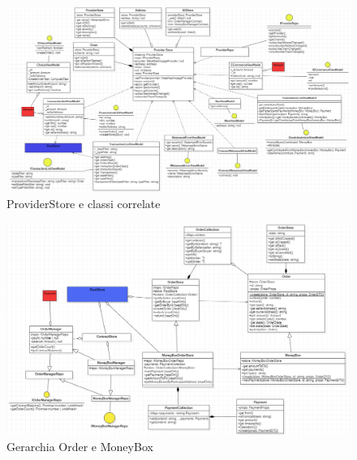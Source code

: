 \begin{landscape}
    \begin{figure}[H]
        \begin{center}
        \includegraphics[scale=0.7]{immagini/providerstore.png}
        \caption{ProviderStore e classi correlate}
        \end{center}
    \end{figure}
\end{landscape}

\begin{landscape}
    \begin{figure}[H]
        \begin{center}
        \includegraphics[scale=0.7]{immagini/order_moneybox.png}
        \caption{Gerarchia Order e MoneyBox}
        \end{center}
    \end{figure}
\end{landscape}


